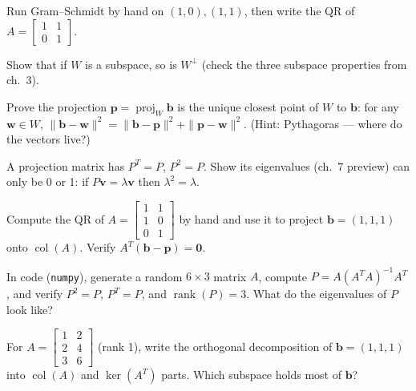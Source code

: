 \begin{exercise}[easy]
Run Gram--Schmidt by hand on $(1,0),(1,1)$, then write the QR of
$A=\begin{bmatrix}1&1\\0&1\end{bmatrix}$.
\end{exercise}

\begin{exercise}[easy]
Show that if $W$ is a subspace, so is $W^\perp$ (check the three
subspace properties from ch.~3).
\end{exercise}

\begin{exercise}[medium]
Prove the projection $\mathbf p=\operatorname{proj}_W\mathbf b$ is the unique
closest point of $W$ to $\mathbf b$: for any $\mathbf w\in W$,
$\|\mathbf b-\mathbf w\|^2=\|\mathbf b-\mathbf p\|^2+\|\mathbf p-\mathbf w\|^2$.
(Hint: Pythagoras --- where do the vectors live?)
\end{exercise}

\begin{exercise}[medium]
A projection matrix has $P^{T}=P$, $P^2=P$. Show its eigenvalues (ch.~7
preview) can only be 0 or 1: if $P\mathbf v=\lambda\mathbf v$ then
$\lambda^2=\lambda$.
\end{exercise}

\begin{exercise}[medium]
Compute the QR of $A=\begin{bmatrix}1&1\\1&0\\0&1\end{bmatrix}$ by hand and
use it to project $\mathbf b=(1,1,1)$ onto $\operatorname{col}(A)$. Verify
$A^{T}(\mathbf b-\mathbf p)=\mathbf0$.
\end{exercise}

\begin{exercise}[medium]
In code (\texttt{numpy}), generate a random $6\times3$ matrix $A$, compute
$P=A(A^{T}A)^{-1}A^{T}$, and verify $P^2=P$, $P^{T}=P$, and
$\operatorname{rank}(P)=3$. What do the eigenvalues of $P$ look like?
\end{exercise}

\begin{exercise}[medium]
For $A=\begin{bmatrix}1&2\\2&4\\3&6\end{bmatrix}$ (rank 1), write the orthogonal
decomposition of $\mathbf b=(1,1,1)$ into $\operatorname{col}(A)$ and
$\ker(A^{T})$ parts. Which subspace holds most of $\mathbf b$?
\end{exercise}

